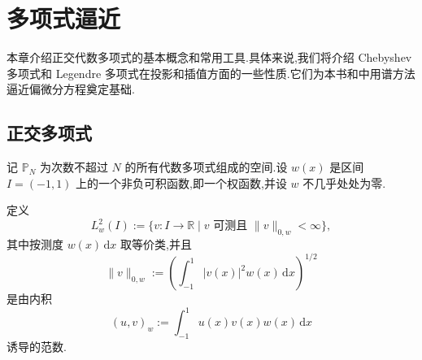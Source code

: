 \chapter{多项式逼近}\label{ch:4}

本章介绍正交代数多项式的基本概念和常用工具.具体来说,我们将介绍 Chebyshev 多项式和 Legendre 多项式在投影和插值方面的一些性质.它们为本书和中用谱方法逼近偏微分方程奠定基础.

\section{正交多项式}\label{sec:4.1}

记 \(\mathbb P_N\) 为次数不超过 \(N\) 的所有代数多项式组成的空间.设 \(w(x)\) 是区间 \(I=(-1,1)\) 上的一个非负可积函数,即一个权函数,并设 \(w\) 不几乎处处为零.

\begin{definition*}[加权 \(L^2\) 空间]
定义
\begin{equation}\label{eq:4.1.1}
  L_w^2(I):=\{v\colon I\to\mathbb R\mid v\text{ 可测且 }\|v\|_{0,w}<\infty\},
\end{equation}
其中按测度 \(w(x)\,\mathrm dx\) 取等价类,并且
\begin{equation}\label{eq:4.1.2}
  \|v\|_{0,w}:=\left(\int_{-1}^1|v(x)|^2w(x)\,\mathrm dx\right)^{1/2}
\end{equation}
是由内积
\begin{equation}\label{eq:4.1.3}
  (u,v)_w:=\int_{-1}^1u(x)v(x)w(x)\,\mathrm dx
\end{equation}
诱导的范数.
\end{definition*}

